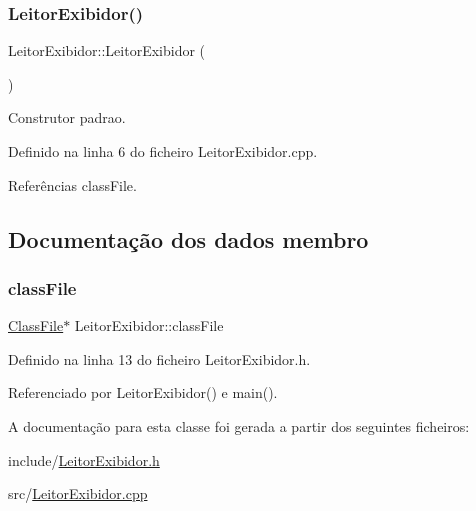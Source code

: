 \subsubsection{\texorpdfstring{Leitor\+Exibidor()}{LeitorExibidor()}\hspace{0.1cm}{\footnotesize\ttfamily [2/2]}}
{\footnotesize\ttfamily Leitor\+Exibidor\+::\+Leitor\+Exibidor (\begin{DoxyParamCaption}{ }\end{DoxyParamCaption})}



Construtor padrao. 



Definido na linha 6 do ficheiro Leitor\+Exibidor.\+cpp.



Referências class\+File.



\subsection{Documentação dos dados membro}
\mbox{\label{classLeitorExibidor_abd4251746a10c01f8bb566c4d6ba55b4}} 
\subsubsection{\texorpdfstring{class\+File}{classFile}}
{\footnotesize\ttfamily \hyperlink{classClassFile}{Class\+File}$\ast$ Leitor\+Exibidor\+::class\+File}



Definido na linha 13 do ficheiro Leitor\+Exibidor.\+h.



Referenciado por Leitor\+Exibidor() e main().



A documentação para esta classe foi gerada a partir dos seguintes ficheiros\+:\begin{DoxyCompactItemize}
\item 
include/\hyperlink{LeitorExibidor_8h}{Leitor\+Exibidor.\+h}\item 
src/\hyperlink{LeitorExibidor_8cpp}{Leitor\+Exibidor.\+cpp}\end{DoxyCompactItemize}
